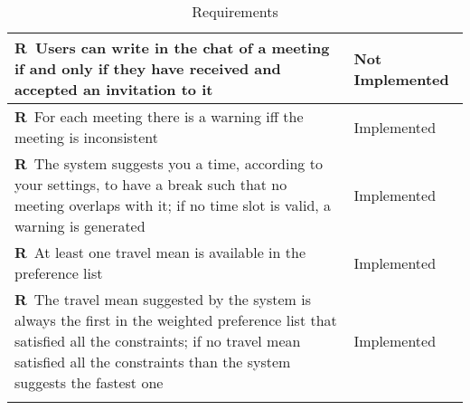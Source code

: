\begin{longtable}{|m{7cm}|m{7cm}|}
	\textbf{R\reqNum}~Users can write in the chat of a meeting if and only if they have received and accepted an invitation to it & Not Implemented	\\ \hline
	\textbf{R\reqNum}~For each meeting there is a warning iff the meeting is inconsistent & Implemented \\ \hline
	\textbf{R\reqNum}~The system suggests you a time, according to your settings, to have a break such that no meeting overlaps with it; if no time slot is valid, a warning is generated & Implemented \\ \hline
	\textbf{R\reqNum}~At least one travel mean is available in the preference list & Implemented \\ \hline
	\textbf{R\reqNum}~The travel mean suggested by the system is always the first in the weighted preference list that satisfied all the constraints; if no travel mean satisfied all the constraints than the system suggests the fastest one & Implemented \\ \hline
	\caption{Requirements}
\end{longtable}